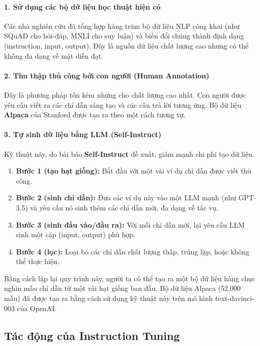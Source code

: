 \paragraph{1. Sử dụng các bộ dữ liệu học thuật hiện có}
Các nhà nghiên cứu đã tổng hợp hàng trăm bộ dữ liệu NLP công khai (như SQuAD cho hỏi-đáp, MNLI cho suy luận) và biến đổi chúng thành định dạng (instruction, input, output). Đây là nguồn dữ liệu chất lượng cao nhưng có thể không đa dạng về mặt diễn đạt.

\paragraph{2. Thu thập thủ công bởi con người (Human Annotation)}
Đây là phương pháp tốn kém nhưng cho chất lượng cao nhất. Con người được yêu cầu viết ra các chỉ dẫn sáng tạo và các câu trả lời tương ứng. Bộ dữ liệu \textbf{Alpaca} của Stanford \cite{alpaca} được tạo ra theo một cách tương tự.

\paragraph{3. Tự sinh dữ liệu bằng LLM (Self-Instruct)}
Kỹ thuật này, do bài báo \textbf{Self-Instruct} \cite{wang2022selfinstruct} đề xuất, giảm mạnh chi phí tạo dữ liệu.
\begin{enumerate}
    \item \textbf{Bước 1 (tạo hạt giống):} Bắt đầu với một vài ví dụ chỉ dẫn được viết thủ công.
    \item \textbf{Bước 2 (sinh chỉ dẫn):} Đưa các ví dụ này vào một LLM mạnh (như GPT-3.5) và yêu cầu nó sinh thêm các chỉ dẫn mới, đa dạng về tác vụ.
    \item \textbf{Bước 3 (sinh đầu vào/đầu ra):} Với mỗi chỉ dẫn mới, lại yêu cầu LLM sinh một cặp (input, output) phù hợp.
    \item \textbf{Bước 4 (lọc):} Loại bỏ các chỉ dẫn chất lượng thấp, trùng lặp, hoặc không thể thực hiện.
\end{enumerate}
Bằng cách lặp lại quy trình này, người ta có thể tạo ra một bộ dữ liệu hàng chục nghìn mẫu chỉ dẫn từ một vài hạt giống ban đầu. Bộ dữ liệu Alpaca (52,000 mẫu) đã được tạo ra bằng cách sử dụng kỹ thuật này trên mô hình text-davinci-003 của OpenAI.

\subsection{Tác động của Instruction Tuning}
\label{ssec:instruction_tuning_impact}

